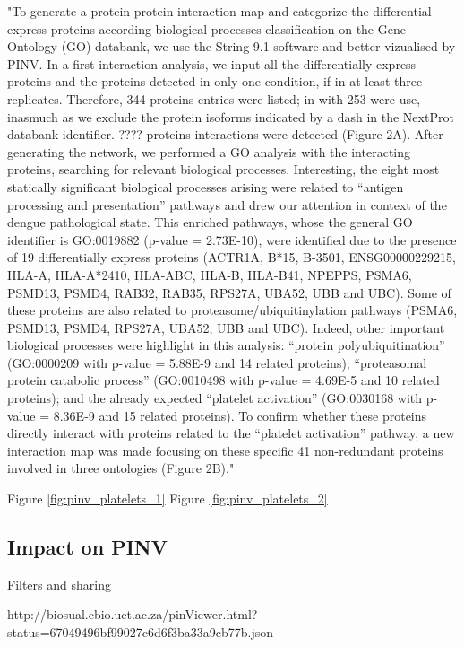 "To generate a protein-protein interaction map and categorize the differential express proteins according biological processes classification on the Gene Ontology (GO) databank, we use the String 9.1 software and better vizualised by PINV. In a first interaction analysis, we input all the differentially express proteins and the proteins detected in only one condition, if in at least three replicates. Therefore, 344 proteins entries were listed; in with 253 were use, inasmuch as we exclude the protein isoforms indicated by a dash in the NextProt databank identifier. ???? proteins interactions were detected (Figure 2A). After generating the network, we performed a GO analysis with the interacting proteins, searching for relevant biological processes. Interesting, the eight most statically significant biological processes arising were related to “antigen processing and presentation” pathways and drew our attention in context of the dengue pathological state. This enriched pathways, whose the general GO identifier is GO:0019882 (p-value =  2.73E-10), were identified due to the presence of 19 differentially express proteins (ACTR1A, B*15, B-3501, ENSG00000229215, HLA-A, HLA-A*2410, HLA-ABC, HLA-B, HLA-B41, NPEPPS, PSMA6, PSMD13, PSMD4, RAB32, RAB35, RPS27A, UBA52, UBB and UBC). Some of these proteins are also related to proteasome/ubiquitinylation pathways (PSMA6, PSMD13, PSMD4, RPS27A, UBA52, UBB and UBC). Indeed, other important biological processes were highlight in this analysis: “protein polyubiquitination” (GO:0000209 with p-value = 5.88E-9 and 14 related proteins); “proteasomal protein catabolic process” (GO:0010498 with p-value = 4.69E-5 and 10 related proteins); and the already expected “platelet activation” (GO:0030168 with p-value = 8.36E-9 and 15 related proteins). To confirm whether these proteins directly interact with proteins related to the “platelet activation” pathway, a new interaction map was made focusing on these specific 41 non-redundant proteins involved in three ontologies (Figure 2B)." 

Figure \ref{fig:pinv_platelets_1}
Figure \ref{fig:pinv_platelets_2}

\subsection{Impact on PINV}
Filters and sharing

http://biosual.cbio.uct.ac.za/pinViewer.html?status=67049496bf99027c6d6f3ba33a9cb77b.json

